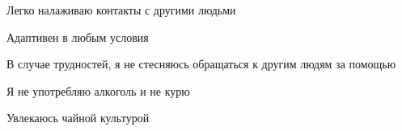 \documentclass[a4paper, 14pt]{article}
\begin{document}
\begin{zitemize}
\item Легко налаживаю контакты с другими людьми
\item Адаптивен в любым условия
\item В случае трудностей, я не стесняюсь обращаться к другим людям за помощью
\item Я не употребляю алкоголь и не курю
\item Увлекаюсь чайной культурой
\end{zitemize}
\end{document}

